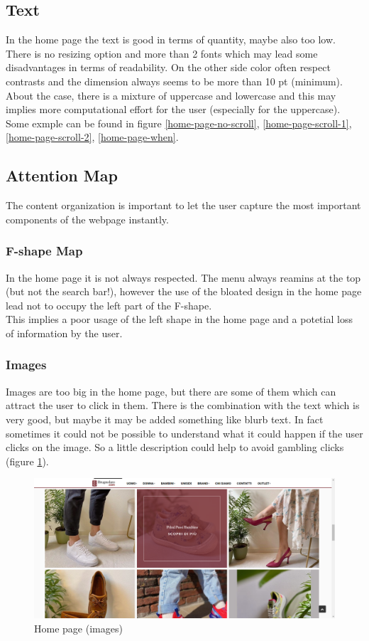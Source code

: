 \subsection{Text}
In the home page the text is good in terms of quantity, maybe also too low.\\
There is no resizing option and more than 2 fonts which may lead some disadvantages
in terms of readability. On the other side color often respect contrasts and the dimension
always seems to be more than 10 pt (minimum).\\ About the case, there is a mixture of
uppercase and lowercase and this may implies more computational effort for the user
(especially for the uppercase).\\ Some exmple can be found in figure \ref{home-page-no-scroll},
\ref{home-page-scroll-1}, \ref{home-page-scroll-2}, \ref{home-page-when}.

\subsection{Attention Map}
The content organization is important to let the user capture the most important
components of the webpage instantly.
\subsubsection{F-shape Map}
In the home page it is not always respected. The menu always reamins at the top (but not the search bar!),
however the use of the bloated design in the home page lead not to occupy the left part of the F-shape.\\
This implies a poor usage of the left shape in the home page and a
potetial loss of information by the user.
\subsubsection{Images}
Images are too big in the home page, but there are some of them which can attract the user to click in them.
There is the combination with the text which is very good, but maybe it may be added
something like blurb text. In fact sometimes it could not be possible to understand
what it could happen if the user clicks on the image. So a little description could
help to avoid gambling clicks (figure \ref{home-page-gambling}).
\begin{figure}[!h] 
    \centering 
    \includegraphics[scale = 0.29]{images/gambling_click.png} 
    \caption{Home page (images)}
    \label{home-page-gambling}
\end{figure}

